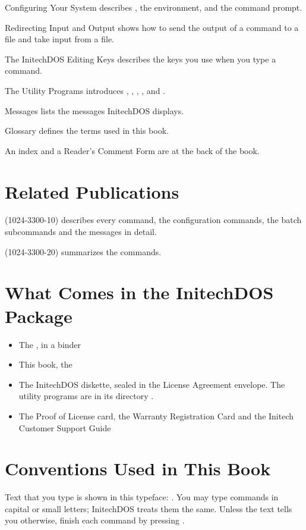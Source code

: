 Configuring Your System describes ,
the environment, and the command prompt.

Redirecting Input and Output shows how to send the
output of a command to a file and take input from a file.

The InitechDOS Editing Keys describes the keys you use
when you type a command.

The Utility Programs introduces ,
, , ,  and .

Messages lists the messages InitechDOS displays.

Glossary defines the terms used in this book.

An index and a Reader's Comment Form are at the back of the book.

\section{Related Publications}
(1024-3300-10) describes every command, the configuration commands, the
batch subcommands and the messages in detail.

(1024-3300-20) summarizes the commands.

\section{What Comes in the InitechDOS Package}
\begin{itemize}
\item The , in a binder
\item This book, the 
\item The InitechDOS diskette, sealed in the License Agreement envelope.
  The utility programs are in its directory .
\item The Proof of License card, the Warranty Registration Card and the
  Initech Customer Support Guide
\end{itemize}

\section{Conventions Used in This Book}
Text that you type is shown in this typeface:
.  You may type commands in capital or small letters; InitechDOS
treats them the same.  Unless the text tells you otherwise, finish each
command by pressing .

